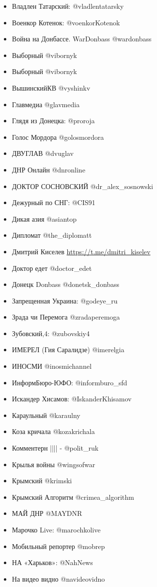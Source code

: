 \begin{itemize}
\item Владлен Татарский: @vladlentatarsky 
\item Военкор Котенок: @voenkorKotenok
\item Война на Донбассе. WarDonbass @wardonbass
\item Выборный @vibornyk
\item Выборный @vibornyk
\item ВышинскийКВ @vyshinkv
\item Главмедиа @glavmedia
\item Глядя из Донецка: @proroja
\item Голос Мордора @golosmordora
\item ДВУГЛАВ @dvuglav
\item ДНР Онлайн @dnronline
\item ДОКТОР СОСНОВСКИЙ @dr\_alex\_sosnowski
\item Дежурный по СНГ: @CIS91
\item Дикая азия @asiantop 
\item Дипломат @the\_diplomatt
\item Дмитрий Киселев \url{https://t.me/dmitri\_kiselev}
\item Доктор едет @doctor\_edet
\item Донецк Donbass @donetsk\_donbass
\item Запрещенная Украина: @godeye\_ru
\item Зрада чи Перемога @zradaperemoga
\item Зубовский,4: @zubovskiy4
\item ИМЕРЕЛ (Гия Саралидзе) @imerelgia 
\item ИНОСМИ @inosmichannel
\item ИнформБюро-ЮФО: @informburo\_sfd
\item Искандер Хисамов: @IskanderKhisamov
\item Караульный @karaulny 
\item Коза кричала @kozakrichala
\item Комментерн |||| - @polit\_ruk
\item Крылья войны @wingsofwar
\item Крымский @krimski
\item Крымский Алгоритм @crimea\_algorithm
\item МАЙ ДНР @MAYDNR
\item Марочко Live: @marochkolive
\item Мобильный репортер @mobrep 
\item НА «Харьков»: @NahNews 
\item На видео видно @navideovidno

\end{itemize}
